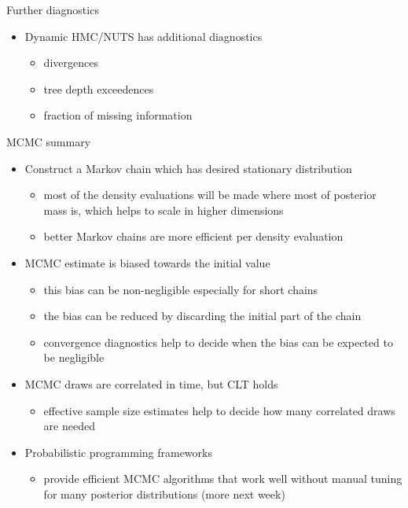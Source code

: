 \documentclass[finnish,english,t]{beamer}
\begin{document}
\begin{frame}
   
   {\Large\color{navyblue} Further diagnostics}

   \begin{itemize}
   \item Dynamic HMC/NUTS has additional diagnostics
     \begin{itemize}
     \item divergences
     \item tree depth exceedences
     \item fraction of missing information
     \end{itemize}
   \end{itemize}
   
 \end{frame}

 \begin{frame}
   
   {\Large\color{navyblue} MCMC summary}

   \begin{itemize}
   \item<+-> Construct a Markov chain which has desired stationary distribution
     \begin{itemize}
     \item most of the density evaluations will be made where most of
       posterior mass is, which helps to scale in higher dimensions
     \item better Markov chains are more efficient per density
       evaluation
     \end{itemize}
   \item<+-> MCMC estimate is biased towards the initial value
     \begin{itemize}
     \item this bias can be non-negligible especially for short chains
     \item the bias can be reduced by discarding the initial part of the chain
     \item convergence diagnostics help to decide when the bias can be expected to be negligible
     \end{itemize}
   \item<+-> MCMC draws are correlated in time, but CLT holds
     \begin{itemize}
     \item effective sample size estimates help to decide how many
       correlated draws are needed
     \end{itemize}
   \item<+-> Probabilistic programming frameworks
     \begin{itemize}
     \item provide efficient MCMC algorithms that work well without
       manual tuning for many posterior distributions (more next week)
   \end{itemize}
 \end{itemize}
   
 \end{frame}
\end{document}
